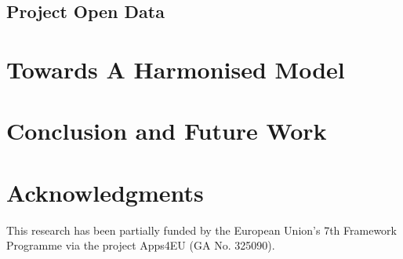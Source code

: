 \documentclass[runningheads,a4paper]{llncs}
\begin{document}
\subsection{Project Open Data}




\section{Towards A Harmonised Model}
\label{sec:hdl}


\section{Conclusion and Future Work}
\label{sec:conclusion}


\section*{Acknowledgments}
This research has been partially funded by the European Union's 7th Framework Programme via the project Apps4EU (GA No. 325090).
\vspace{0.5cm}


\nocite{*}

\end{document}
